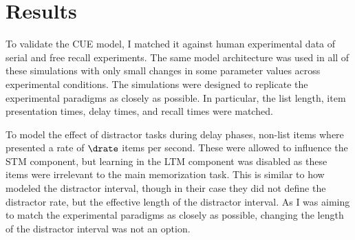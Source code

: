 \chapter{Results}
To validate the CUE model, I matched it against human experimental data of serial and free recall experiments.
The same model architecture was used in all of these simulations with only small changes in some parameter values across experimental conditions.
The simulations were designed to replicate the experimental paradigms as closely as possible.
In particular, the list length, item presentation times, delay times, and recall times were matched.

To model the effect of distractor tasks during delay phases, non-list items where presented a rate of $\drate$ items per second.
These were allowed to influence the STM component, but learning in the LTM component was disabled as these items were irrelevant to the main memorization task.
This is similar to how \textcite{Howard2002} modeled the distractor interval, though in their case they did not define the distractor rate, but the effective length of the distractor interval.
As I was aiming to match the experimental paradigms as closely as possible, changing the length of the distractor interval was not an option.

